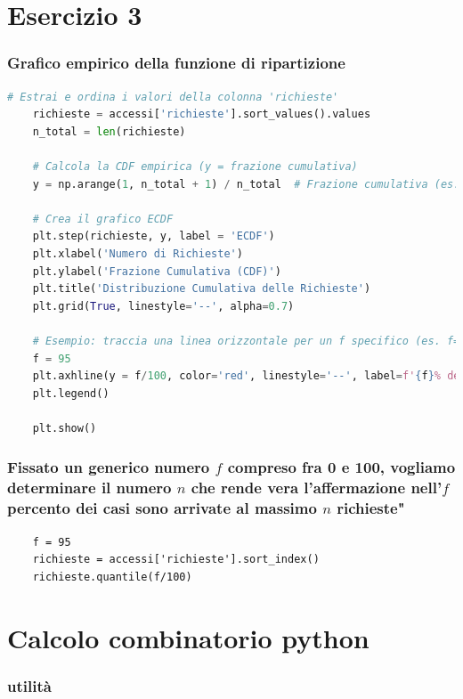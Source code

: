 \documentclass{article}
\begin{document}
\section{Esercizio 3}

\subsubsection*{Grafico empirico della funzione di ripartizione}

\begin{lstlisting}[language=Python]
    # Estrai e ordina i valori della colonna 'richieste'
    richieste = accessi['richieste'].sort_values().values
    n_total = len(richieste)

    # Calcola la CDF empirica (y = frazione cumulativa)
    y = np.arange(1, n_total + 1) / n_total  # Frazione cumulativa (es. 0.2, 0.4, ..., 1.0)

    # Crea il grafico ECDF
    plt.step(richieste, y, label = 'ECDF')
    plt.xlabel('Numero di Richieste')
    plt.ylabel('Frazione Cumulativa (CDF)')
    plt.title('Distribuzione Cumulativa delle Richieste')
    plt.grid(True, linestyle='--', alpha=0.7)

    # Esempio: traccia una linea orizzontale per un f specifico (es. f=95%)
    f = 95
    plt.axhline(y = f/100, color='red', linestyle='--', label=f'{f}% dei casi')
    plt.legend()

    plt.show()
\end{lstlisting}

\subsubsection*{Fissato un generico numero $f$ compreso fra 0 e 100, vogliamo determinare il numero $n$ che rende vera l'affermazione nell'$f$ percento dei casi sono arrivate al massimo $n$ richieste"}

\begin{lstlisting}
    f = 95
    richieste = accessi['richieste'].sort_index()
    richieste.quantile(f/100)
\end{lstlisting}
\section{Calcolo combinatorio python}

\subsubsection*{utilità}
\end{document}
